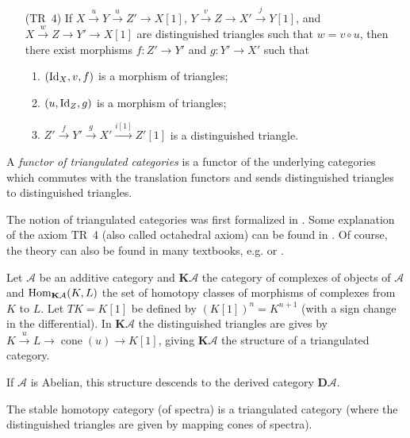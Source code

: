 \documentclass[english]{short-notes}
\newcommand\derived{\mathbf D}
\renewcommand\cat{\mathcal}
\begin{document}
\begin{Def}
\begin{enumerate}
            \item[(TR~4)]
                If $X \xrightarrow{u} Y \xrightarrow{u} Z' → X[1]$,
                $Y \xrightarrow{v} Z \xrightarrow{} X' \xrightarrow{j} Y[1]$, and
                $X \xrightarrow{w} Z \xrightarrow{} Y' \xrightarrow{} X[1]$
                are distinguished triangles such that $w = v∘u$, then there exist morphisms $f\colon Z' → Y'$ and $g\colon Y' → X'$ such that
                \begin{enumerate}[1)]
                    \item $(\id[X],v,f)$ is a morphism of triangles;
                    \item $(u, \id[Z],g)$ is a morphism of triangles;
                    \item $Z' \xrightarrow{f} Y' \xrightarrow{g} X' \xrightarrow{i[1]} Z'[1]$ is a distinguished triangle.
                \end{enumerate}
    \end{enumerate}
    A \emph{functor of triangulated categories} is a functor of the underlying categories which commutes with the translation functors and sends distinguished triangles to distinguished triangles.
\end{Def}

The notion of triangulated categories was first formalized in \cite{Verdier:1977:CategoriesDerivees}.
Some explanation of the axiom TR~4 (also called octahedral axiom) can be found in \cite[Section~1.1]{BeilinsonBernsteinDeligne:1982:FaisceauxPervers}.
Of course, the theory can also be found in many textbooks, e.g. \cite{KashiwaraSchapira:2006:CategoriesAndSheaves} or \cite{Weibel:1994:IntroToHomologicalAlgebra}.

\begin{Ex}
    Let $\cat A$ be an additive category and $\mathbf K\cat A$ the category of complexes of objects of $\cat A$ and $\Hom_{\mathbf K\cat A}(K,L)$ the set of homotopy classes of morphisms of complexes from $K$ to $L$.
    Let $TK = K[1]$ be defined by $(K[1])^n = K^{n+1}$ (with a sign change in the differential).
    In $\mathbf K\cat A$ the distinguished triangles are gives by $K \xrightarrow{u} L → \operatorname{cone}(u) → K[1]$, giving $\mathbf K\cat A$ the structure of a triangulated category.

    If $\cat A$ is Abelian, this structure descends to the derived category $\derived \cat A$.
\end{Ex}

\begin{Ex}
    The stable homotopy category (of spectra) is a triangulated category (where the distinguished triangles are given by mapping cones of spectra).
\end{Ex}
\end{document}
